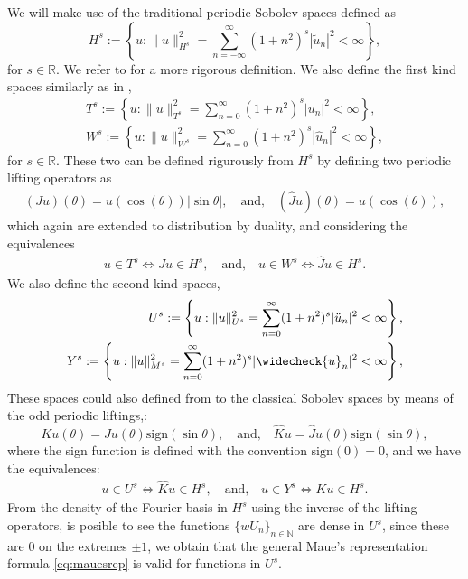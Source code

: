 \documentclass{article}
\newcommand{\IN}{{\mathbb N}}
\newcommand{\IR}{{\mathbb R}}
\begin{document}
We will make use of the traditional periodic Sobolev spaces defined as 
$$
H^s := \left\lbrace u : \| u\|_{H^s}^2 = \sum_{n=-\infty}^\infty (1+n^2)^s |\widetilde{u}_n|^2 < \infty \right\rbrace,
$$
for $s\in \IR$. We refer to \cite[Chapter 5]{saranen2013periodic} for a more rigorous definition. We also define the first kind spaces similarly as in \cite{Averseng2019},
\begin{align*}
T^s := \left\lbrace u : \| u\|_{T^s}^2 = \sum_{n=0}^\infty (1+n^2)^s |{u}_n|^2 < \infty \right\rbrace, \\
W^s := \left\lbrace u : \| u\|_{W^s}^2 = \sum_{n=0}^\infty (1+n^2)^s |\widehat{u}_n|^2 < \infty \right\rbrace,
\end{align*} 
for $s \in \IR$. These two can be defined rigurously from $H^s$ by defining two periodic lifting operators  as 
\begin{align}
\label{eq:liffings}
(Ju) (\theta) = u(\cos(\theta)) | \sin \theta|, \quad \text{and,} \quad
(\widehat{J}u)(\theta) = u (\cos(\theta)),
\end{align}
which again are extended to distribution by duality, and considering the equivalences 
\begin{align*}
u \in T^s \Leftrightarrow Ju \in H^s, \quad \text{and,} \quad u \in W^s \Leftrightarrow \widehat{J}u \in H^s.
\end{align*}
We also define the second kind spaces, 
\begin{align*}
U^s := \left\lbrace u : \| u\|_{U^s}^2 = \sum_{n=0}^\infty (1+n^2)^s |\ddot{u}_n|^2 < \infty \right\rbrace, \\
Y^s := \left\lbrace u : \| {u}\|_{M^s}^2 = \sum_{n=0}^\infty (1+n^2)^s |\widecheck{u}_n|^2 < \infty \right\rbrace,
\end{align*} 
These spaces could also defined from to the classical Sobolev spaces by means of the odd periodic liftings,:
$$
Ku(\theta) = Ju(\theta) \text{sign}(\sin\theta), \quad \text{and,}\quad \widehat{K}u = \widehat{J}u(\theta) \text{sign}(\sin\theta),
$$
where the sign function is defined with the convention $\text{sign}(0)=0$, and we have the equivalences: 
\begin{align*}
u \in U^s \Leftrightarrow \widehat{K}u \in H^s, \quad \text{and,} \quad u \in Y^s \Leftrightarrow Ku \in H^s.
\end{align*}
From the density of the Fourier basis in $H^s$ using the inverse of the lifting operators, is posible to see the functions $\{wU_n\}_{n \in \IN}$ are dense in $U^s$, since these are $0$
on the extremes $\pm 1$, we obtain that the general Maue's representation formula \eqref{eq:mauesrep} is valid for functions in $U^s$.  
\end{document}
